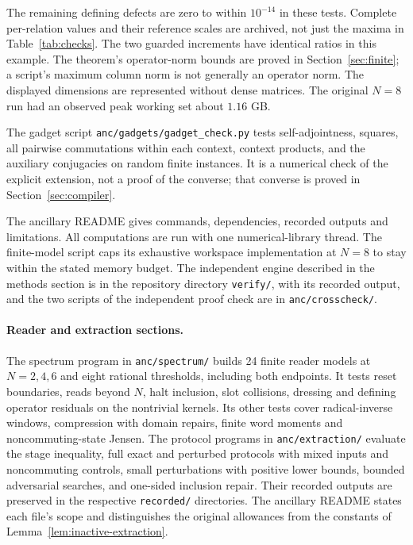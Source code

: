 The remaining defining defects are zero to within $10^{-14}$ in these tests. Complete per-relation values and their reference scales are archived, not just the maxima in Table~\ref{tab:checks}. The two guarded increments have identical ratios in this example. The theorem's operator-norm bounds are proved in Section~\ref{sec:finite}; a script's maximum column norm is not generally an operator norm. The displayed dimensions are represented without dense matrices. The original $N=8$ run had an observed peak working set about $1.16$ GB.

The gadget script \texttt{anc/gadgets/gadget\_check.py} tests self-adjointness, squares, all pairwise commutations within each context, context products, and the auxiliary conjugacies on random finite instances. It is a numerical check of the explicit extension, not a proof of the converse; that converse is proved in Section~\ref{sec:compiler}.

The ancillary README gives commands, dependencies, recorded outputs and limitations. All computations are run with one numerical-library thread. The finite-model script caps its exhaustive workspace implementation at $N=8$ to stay within the stated memory budget. The independent engine described in the methods section is in the repository directory \texttt{verify/}, with its recorded output, and the two scripts of the independent proof check are in \texttt{anc/crosscheck/}.


\paragraph{Reader and extraction sections.} The spectrum program in \texttt{anc/spectrum/} builds 24 finite reader models at $N=2,4,6$ and eight rational thresholds, including both endpoints. It tests reset boundaries, reads beyond $N$, halt inclusion, slot collisions, dressing and defining operator residuals on the nontrivial kernels. Its other tests cover radical-inverse windows, compression with domain repairs, finite word moments and noncommuting-state Jensen. The protocol programs in \texttt{anc/extraction/} evaluate the stage inequality, full exact and perturbed protocols with mixed inputs and noncommuting controls, small perturbations with positive lower bounds, bounded adversarial searches, and one-sided inclusion repair. Their recorded outputs are preserved in the respective \texttt{recorded/} directories. The ancillary README states each file's scope and distinguishes the original allowances from the constants of Lemma~\ref{lem:inactive-extraction}.


